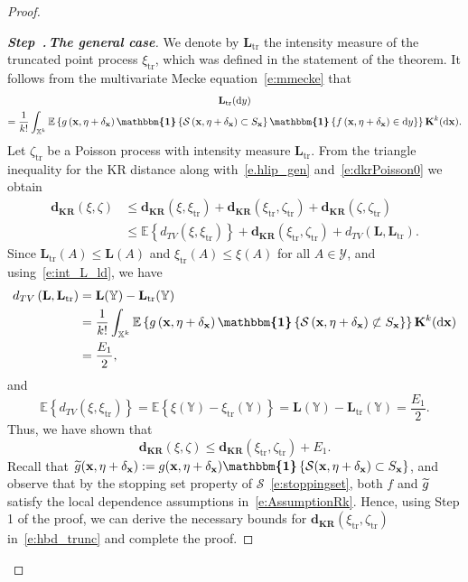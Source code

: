 \documentclass[AHL,Unicode,longabstracts]{cedram}
\newcommand*\bL{\mathbf{L}}
\newcommand*\bK{\mathbf{K}}
\newcommand{\bx}{\mathbf{x}}
\newcommand*\dkr{\mathbf{d_{KR}}}
\newcommand*\X{\mathbb{X}}
\newcommand*\Y{\mathbb{Y}}
\newcommand{\E}{\mathbb{E}}
\newcommand*\cS{\mathcal{S}}
\newcommand*\cY{\mathcal{Y}}
\newcommand{\tr}{\mathrm{tr}}
\newcommand*\md{\mathrm{d}}
\newcommand{\mean}[1] {\E\left\{{#1}\right\}}
\newcommand{\ind}{\boldsymbol{\mathbbm{1}}}
\newcommand{\set}[1]{\left\{#1\right\}}
\newcommand{\tg}{\tilde{g}}
\newcounter{stepcount}
\newenvironment{step}[1]{\refstepcounter{stepcount}\begin{proof}[\emph{\textbf{Step~\thestepcount.\,}{\textbf{#1}}}]}
{\let\qed\relax\end{proof}}
\let\oldtilde\tilde
\renewcommand*{\tilde}[1]{\mathchoice{\widetilde{#1}}{\widetilde{#1}}{\oldtilde{#1}}{\oldtilde{#1}}}
\begin{document}
\begin{proof}
\begin{step}{{The general case}}
We denote by $\bL_{\tr}$ the intensity measure of the truncated point process $\xi_{\tr}$, which was defined in the statement of the theorem. It follows from the multivariate Mecke equation~\eqref{e:mmecke} that
\begin{multline*}
\bL_{\tr}(\md y) \\
= \frac{1}{k!}\int_{\X^k} \mean{g\left(\bx,\eta+\delta_{\bx}\right) \ind\set{\cS\left(\bx,\eta+\delta_{\bx}\right) \subset S_{\bx}} \ind\set{f\left(\bx,\eta+\delta_{\bx}\right)\in \md y}} \bK^k(\md\bx).
\end{multline*}
Let $\zeta_{\tr}$ be a Poisson process with intensity measure $\bL_{\tr}$. From the triangle inequality for the KR distance along with~\eqref{e.hlip_gen} and~\eqref{e:dkrPoisson0} we obtain
\begin{align*}
\dkr(\xi,\zeta) & \leq \dkr\left(\xi,\xi_{\tr}\right) + \dkr\left(\xi_{\tr},\zeta_{\tr}\right) + \dkr\left(\zeta,\zeta_{\tr}\right) \\
& \leq \mean{d_{TV}\left(\xi,\xi_{\tr}\right)} + \dkr\left(\xi_{\tr},\zeta_{\tr}\right) + d_{TV}\left(\bL,\bL_{\tr}\right) \nonumber.
\end{align*}
Since $\bL_{\tr}(A) \leq \bL(A)$ and $\xi_{\tr}(A) \leq \xi(A)$ for all $A\in\cY$, and using~\eqref{e:int_L_ld}, we have
\begin{align*}
d_{TV}\left(\bL,\bL_{\tr}\right) &= \bL(\Y) - \bL_{\tr}(\Y)\\
 &= \frac{1}{k!}\int_{\X^k} \mean{g\left(\bx,\eta+\delta_{\bx}\right) \ind\set{\cS\left(\bx,\eta+\delta_{\bx}\right) \not\subset S_{\bx}}} \bK^k(\md\bx) \\
&= \frac{E_1}{2},
\end{align*}
and
\[
\mean{d_{TV}\left(\xi,\xi_{\tr}\right)} = \mean{ \xi(\Y) - \xi_{\tr}(\Y) } = \bL(\Y) - \bL_{\tr}(\Y) = \frac{E_1}{2}.
\]
Thus, we have shown that
\begin{equation}\label{e:hbd_trunc}
\dkr(\xi,\zeta) \leq \dkr\left(\xi_{\tr},\zeta_{\tr}\right) + E_1.
\end{equation}
Recall that $\tg(\bx,\eta+\delta_{\bx}) := g(\bx,\eta+\delta_{\bx})\ind\set{\cS(\bx,\eta+\delta_{\bx}) \subset S_{\bx}}$, and observe that by the stopping set property of $\cS$~\eqref{e:stoppingset}, both $f$ and $\tg$ satisfy the local dependence assumptions in~\eqref{e:AssumptionRk}. Hence, using Step 1 of the proof, we can derive the necessary bounds for $\dkr(\xi_{\tr},\zeta_{\tr})$ in~\eqref{e:hbd_trunc} and complete the proof.\qedhere
\end{step}\let\qed\relax
\end{proof}
\end{document}
